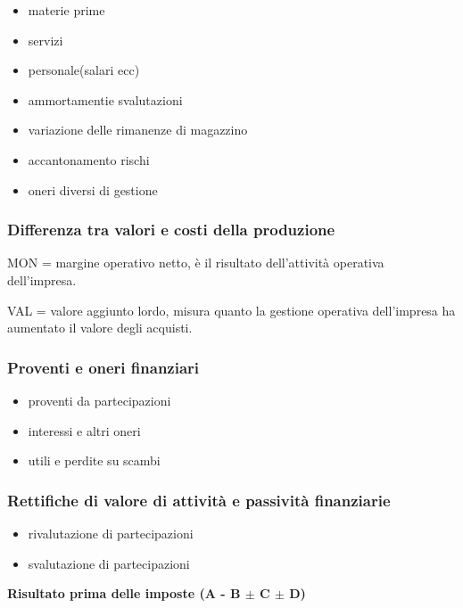 \begin{itemize}
    \item materie prime
    \item servizi
    \item personale(salari ecc)
    \item ammortamentie svalutazioni
    \item variazione delle rimanenze di magazzino
    \item accantonamento rischi
    \item oneri diversi di gestione
\end{itemize}

\subsubsection{Differenza tra valori e costi della produzione}
MON = margine operativo netto, è il risultato dell'attività operativa dell'impresa.


VAL = valore aggiunto lordo, misura quanto la gestione operativa dell'impresa ha aumentato il valore degli acquisti.

\subsubsection{Proventi e oneri finanziari}
\begin{itemize}
    \item proventi da partecipazioni
    \item interessi e altri oneri
    \item utili e perdite su scambi
\end{itemize}

\subsubsection{Rettifiche di valore di attività e passività finanziarie}
\begin{itemize}
    \item rivalutazione di partecipazioni
    \item svalutazione di partecipazioni
\end{itemize}

\textbf{Risultato prima delle imposte (A - B $\pm$ C $\pm$ D)}